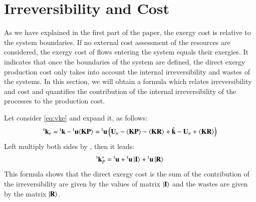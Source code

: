 \documentclass{ecos2018}
\begin{document}
\section{Irreversibility and Cost}
As we have explained in the first part of the paper, the exergy cost is relative to the system boundaries. If no external cost assessment of the resources are considered, the exergy cost of flows entering the system equals their exergies. It indicates that once the boundaries of the system are defined, the direct exergy production cost only takes into account the internal irreversibility and wastes of the systems. In this section, we will obtain a formula which relates irreversibility and cost and quantifies the contribution of the internal irreversibility of the processes to the production cost.

Let consider \cref{eq:vke} and expand it, as follows:
\begin{equation}
\prescript{\smash{\mathrm{t}}}{}{\mathbf{k}}_e=\prescript{\smash{\mathrm{t}}}{}{\mathbf{k}}-\prescript{\smash{\mathrm{t}}}{}{\mathbf{u}}\langle \textbf{KP} \rangle=\prescript{\smash{\mathrm{t}}}{}{\mathbf{u}}\left(\mathbf{U}_n-\langle \textbf{KP} \rangle-\langle \textbf{KR} \rangle+ \hat{\mathbf{k}}- \mathbf{U}_n + \langle \textbf{KR} \rangle\right)
\end{equation}
Left multiply both sides by , then it leads:
\begin{equation}
\label{eq:dicf}
\prescript{\smash{\mathrm{t}}}{}{\mathbf{k}}_P^*=\prescript{\smash{\mathrm{t}}}{}{\mathbf{u}} + \prescript{\smash{\mathrm{t}}}{}{\mathbf{u}}\left| {\textbf{I} } \right\rangle+\prescript{\smash{\mathrm{t}}}{}{\mathbf{u}}\left| {\textbf{R} } \right\rangle
\end{equation}
This formula shows that the direct exergy cost is the sum of the contribution of the irreversibility are given by the values of matrix $\left| {\textbf{I} } \right\rangle$ and the wastes are given by the matrix $\left| {\textbf{R} } \right\rangle$.
\end{document}
